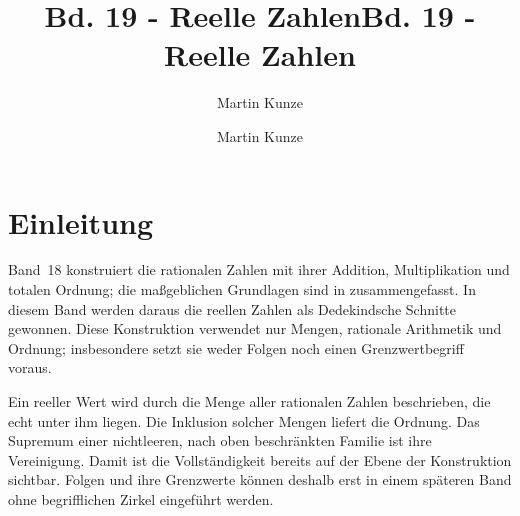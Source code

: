 \documentclass[main.tex]{subfiles}
\title{Bd. 19 - Reelle Zahlen}
\author{Martin Kunze}
\date{}
\begin{document}
\title{Bd. 19 - Reelle Zahlen}
\author{Martin Kunze}
\date{}
\hypersetup{pageanchor=false}
\maketitle
\hypersetup{pageanchor=true}
\setcounter{tocdepth}{3}
\tableofcontents
\setcounter{file}{19}
\renewcommand{\FormulaBandID}{19}

\providecommand{\RealCut}[1]{\operatorname{Cut}_{\mathbb Q}\!\left(#1\right)}
\providecommand{\RealHat}[1]{\widehat{#1}}
\providecommand{\RealEmb}{\iota_{\mathbb R}}
\providecommand{\RealLe}{\mathrel{\leq_{\mathbb R}}}
\providecommand{\RealLt}{\mathrel{<_{\mathbb R}}}
\providecommand{\RealZero}{0_{\mathbb R}}
\providecommand{\RealOne}{1_{\mathbb R}}
\providecommand{\RealAdd}{\mathbin{\oplus}}
\providecommand{\RealMul}{\mathbin{\odot}}
\providecommand{\RealPosMul}{\mathbin{\odot_{+}}}
\providecommand{\RealNeg}[1]{\mathop{\ominus}\!#1}
\providecommand{\RealPosInv}[1]{\operatorname{inv}_{+}\!\left(#1\right)}
\providecommand{\RealInv}[1]{\operatorname{inv}_{\mathbb R}\!\left(#1\right)}
\providecommand{\RealAbs}[1]{\left\lvert #1\right\rvert_{\mathbb R}}
\providecommand{\RealDist}[2]{d_{\mathbb R}\!\left(#1,#2\right)}
\providecommand{\CompleteOrderedField}[1]{\mathsf{COF}\!\left(#1\right)}
\providecommand{\IntegerPrimeEmbeddingLaws}[1]{%
  \mathsf{ZEmb}_{K}\!\left(#1\right)}
\providecommand{\RationalPrimeEmbeddingLaws}[1]{%
  \mathsf{QEmb}_{K}\!\left(#1\right)}

\chapter{Einleitung}

Band~18 konstruiert die rationalen Zahlen mit ihrer Addition,
Multiplikation und totalen Ordnung; die maßgeblichen Grundlagen sind in
 zusammengefasst. In diesem Band
werden daraus die reellen Zahlen als Dedekindsche Schnitte gewonnen. Diese
Konstruktion verwendet nur Mengen, rationale Arithmetik und Ordnung;
insbesondere setzt sie weder Folgen noch einen Grenzwertbegriff voraus.

Ein reeller Wert wird durch die Menge aller rationalen Zahlen beschrieben,
die echt unter ihm liegen. Die Inklusion solcher Mengen liefert die Ordnung.
Das Supremum einer nichtleeren, nach oben beschränkten Familie ist ihre
Vereinigung. Damit ist die Vollständigkeit bereits auf der Ebene der
Konstruktion sichtbar. Folgen und ihre Grenzwerte können deshalb erst in
einem späteren Band ohne begrifflichen Zirkel eingeführt werden.
\end{document}
